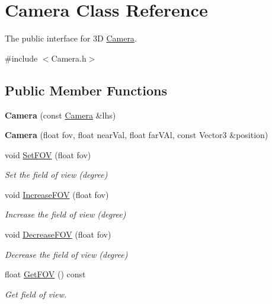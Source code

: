 \hypertarget{classCamera}{}\section{Camera Class Reference}
\label{classCamera}


The public interface for 3D \hyperlink{classCamera}{Camera}.  




{\ttfamily \#include $<$Camera.\+h$>$}

\subsection*{Public Member Functions}
\begin{DoxyCompactItemize}
\item 
\mbox{\label{classCamera_ad6ec69dd0867f0c3eea93421977af1af}} 
{\bfseries Camera} (const \hyperlink{classCamera}{Camera} \&lhs)
\item 
\mbox{\label{classCamera_ab1abbdc02f4eab52c9a5af67b4c200d7}} 
{\bfseries Camera} (float fov, float near\+Val, float far\+V\+Al, const Vector3 \&position)
\item 
void \hyperlink{classCamera_aea06aa6e65a320393f703378f46ba40f}{Set\+F\+OV} (float fov)
\begin{DoxyCompactList}\small\item\em Set the field of view (degree) \end{DoxyCompactList}\item 
void \hyperlink{classCamera_a57e39ce60794095afebda3d38b681fe9}{Increase\+F\+OV} (float fov)
\begin{DoxyCompactList}\small\item\em Increase the field of view (degree) \end{DoxyCompactList}\item 
void \hyperlink{classCamera_a0d7a72fc6b726a97bc2babf0bb09550e}{Decrease\+F\+OV} (float fov)
\begin{DoxyCompactList}\small\item\em Decrease the field of view (degree) \end{DoxyCompactList}\item 
float \hyperlink{classCamera_aacd8360b4fb585a3cdc44ea83e55fc36}{Get\+F\+OV} () const
\begin{DoxyCompactList}\small\item\em Get field of view. \end{DoxyCompactList}\item 

\end{DoxyCompactItemize}
